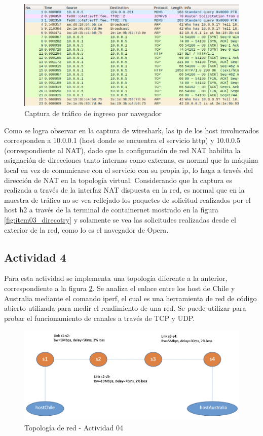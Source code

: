 \documentclass[10pt]{article}
\begin{document}
\begin{figure}[H]
    \centering
    \includegraphics[width=0.9\linewidth]{Imagenes/item03_GET_Wireshark.png}
    \caption{Captura de tráfico de ingreso por navegador}
    \label{fig:item03_directory_wireshark}
\end{figure}

Como se logra observar en la captura de wireshark, las ip de los host involucrados corresponden a 10.0.0.1 (host donde se encuentra el servicio http) y 10.0.0.5 (correspondiente al NAT), dado que la configuración de red NAT habilita la asignación de direcciones tanto internas como externas, es normal que la máquina local en vez de comunicarse con el servicio con su propia ip, lo haga a través del dirección de NAT en la topología virtual. Considerando que la captura es realizada a través de la interfaz NAT dispuesta en la red, es normal que en la muestra de tráfico no se vea reflejado los paquetes de solicitud realizados por el host h2 a través de la terminal de containernet mostrado en la figura \ref{fig:item03_direcotry} y solamente se vea las solicitudes realizadas desde el exterior de la red, como lo es el navegador de Opera.


\subsection{Actividad 4}

Para esta actividad se implementa una topología diferente a la anterior, correspondiente a la figura \ref{fig:item04_net}. Se analiza el enlace entre los host de Chile y Australia mediante el comando iperf, el cual es una herramienta de red de código abierto utilizada para medir el rendimiento de una red. Se puede utilizar para probar el funcionamiento de canales a través de TCP y UDP.

\begin{figure}[H]
    \centering
    \includegraphics[width=0.7\linewidth]{Imagenes/item04_network.png}
    \caption{Topología de red - Actividad 04}
    \label{fig:item04_net}
\end{figure}
\end{document}

